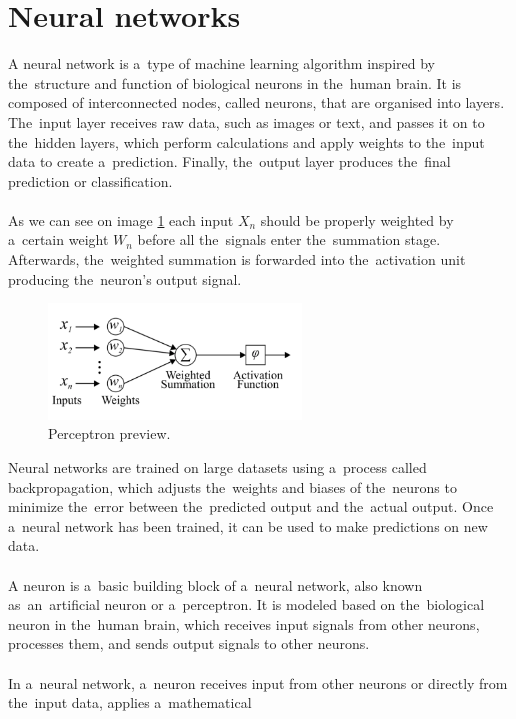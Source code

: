 \section{Neural networks} \label{sec:nn}
A neural network is a~type of machine learning algorithm inspired by the~structure and function of biological neurons
in the~human brain. It is composed of interconnected nodes, called neurons, that are organised into layers. The~input
layer receives raw data, such as images or text, and passes it on to the~hidden layers, which perform calculations and
apply weights to the~input data to create a~prediction. Finally, the~output layer produces the~final prediction
or classification.\\
\\
As we can see on image \ref{fig:perceptron} each input $X_n$ should be properly weighted by a~certain weight $W_n$ before
all the~signals enter the~summation stage. Afterwards, the~weighted summation is forwarded into the~activation unit
producing the~neuron’s output signal.
\begin{center}
    \begin{figure}[!ht]
        \centering
        \includegraphics[width=0.6\textwidth]{figures/nn}
        \caption{Perceptron preview. \cite{Mourgias-Alexandris:19}}
        \label{fig:perceptron}
    \end{figure}
\end{center}
Neural networks are trained on large datasets using a~process called backpropagation, which adjusts the~weights and
biases of the~neurons to minimize the~error between the~predicted output and the~actual output. Once a~neural network
has been trained, it can be used to make predictions on new data.\\
\\
A neuron is a~basic building block of a~neural network, also known as~an~artificial neuron or a~perceptron.
It is modeled based on the~biological neuron in the~human brain, which receives input signals from other neurons,
processes them, and sends output signals to other neurons.\\
\\
In a~neural network, a~neuron receives input from other neurons or directly from the~input data, applies a~mathematical
